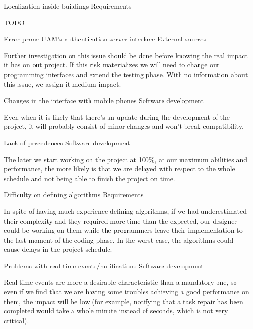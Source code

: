 \begin{risk}[riskLocalization]{Localization inside buildings}
\riskcat Requirements

TODO
\end{risk}

\begin{risk}[riskAuthServer]{Error-prone UAM's authentication server interface}
\riskcat External sources

Further investigation on this issue should be done before knowing the real impact it has on out project. If this risk materializes we will need to change our programming interfaces and extend the testing phase. With no information about this issue, we assign it medium impact.
\end{risk}

\begin{risk}[riskPhone]{Changes in the interface with mobile phones}
\riskcat Software development

Even when it is likely that there's an update during the development of the project, it will probably consist of minor changes and won't break compatibility.
\end{risk}

\begin{risk}[riskPrec]{Lack of precedences}
\riskcat Software development

The later we start working on the project at 100\%, at our maximum abilities and performance, the more likely is that we are delayed with respect to the whole schedule and not being able to finish the project on time.
\end{risk}

\begin{risk}[riskAlgorithms]{Difficulty on defining algorithms}
\riskcat Requirements

In spite of having much experience defining algorithms, if we had underestimated their complexity and they required more time than the expected, our designer could be working on them while the programmers leave their implementation to the last moment of the coding phase. In the worst case, the algorithms could cause delays in the project schedule.
\end{risk}

\begin{risk}[riskRealTime]{Problems with real time events/notifications}
\riskcat Software development

Real time events are more a desirable characteristic than a mandatory one, so even if we find that we are having some troubles achieving a good performance on them, the impact will be low (for example, notifying that a task repair has been completed would take a whole minute instead of seconds, which is not very critical).
\end{risk}

